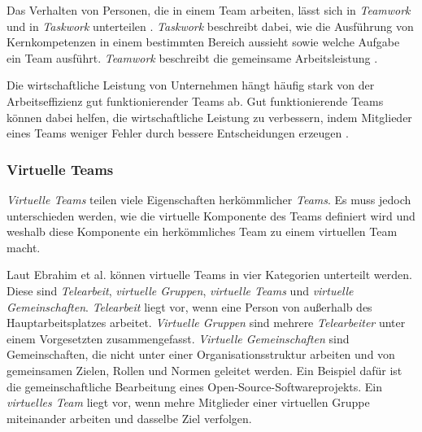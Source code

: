 \documentclass[a4paper,11pt]{article}%
\renewcommand{\\}{\vspace*{0.5\baselineskip} \newline}
\begin{document}
Das Verhalten von Personen, die in einem Team arbeiten, lässt sich in \textit{Teamwork} und in  \textit{Taskwork} unterteilen \citep[S. 541-542]{rousseau2006teamwork}.
 \textit{Taskwork} beschreibt dabei, wie die Ausführung von Kernkompetenzen in einem bestimmten Bereich aussieht sowie welche Aufgabe ein Team ausführt.
 \textit{Teamwork} beschreibt die gemeinsame Arbeitsleistung \citep[S. 357]{marks2001temporally}.
 
Die wirtschaftliche Leistung von Unternehmen hängt häufig stark von der Arbeitseffizienz gut funktionierender Teams ab. Gut funktionierende Teams können dabei helfen, die wirtschaftliche Leistung zu verbessern, indem Mitglieder eines Teams weniger Fehler durch bessere Entscheidungen erzeugen \citep[S. 1-6]{biech2007pfeiffer}. 
%
\subsubsection{Virtuelle Teams}
\label{vts}
\textit{Virtuelle Teams} teilen viele Eigenschaften herkömmlicher \textit{Teams}. Es muss jedoch unterschieden werden, wie die virtuelle Komponente des Teams definiert wird und weshalb diese Komponente ein herkömmliches Team zu einem virtuellen Team macht.

Laut Ebrahim et al. \citep{ale2009virtual} können virtuelle Teams in vier Kategorien unterteilt werden.
Diese sind \textit{Telearbeit}, \textit{virtuelle Gruppen}, \textit{virtuelle Teams} und \textit{virtuelle Gemeinschaften}.
\textit{Telearbeit} liegt vor, wenn eine Person von außerhalb des Hauptarbeitsplatzes arbeitet. \textit{Virtuelle Gruppen} sind mehrere \textit{Telearbeiter} unter einem Vorgesetzten zusammengefasst.
\textit{Virtuelle Gemeinschaften} sind Gemeinschaften, die nicht unter einer Organisationsstruktur arbeiten und von gemeinsamen Zielen, Rollen und Normen geleitet werden. Ein Beispiel dafür ist die gemeinschaftliche Bearbeitung eines Open-Source-Softwareprojekts. Ein \textit{virtuelles Team} liegt vor, wenn mehre Mitglieder einer virtuellen Gruppe miteinander arbeiten und dasselbe Ziel verfolgen.
 
\end{document}
